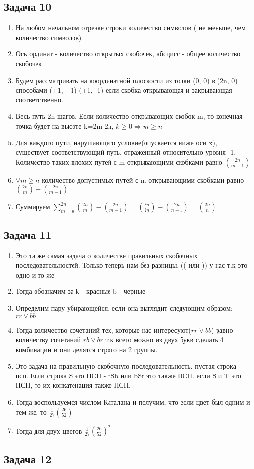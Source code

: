 \documentclass[a4paper,12pt]{article}
\begin{document}
\subsection{Задача 10}
\begin{enumerate}
    \item На любом начальном отрезке строки количество символов ( не меньше, чем количество символов)
    \item Ось ординат - количество открытых скобочек, абсцисс - общее количество скобочек
    \item Будем рассматривать на координатной плоскости из точки (0, 0) в (2n, 0) способами (+1, +1) (+1, -1) если скобка открывающая и закрывающая соответственно.
    \item Весь путь 2n шагов, Если количество открывающих скобок m, то конечная точка будет на высоте k=2m-2n, $k\ge 0 \Rightarrow m\ge n$ 
    \item Для каждого пути, нарушающего условие(опускается ниже оси x), существует соответствующий путь, отраженный относительно уровня -1. Количество таких плохих путей с m открывающими скобками равно $\binom{2n}{m-1}$
    \item $\forall m\ge n$ количество допустимых путей с m открывающими скобками равно $\binom{2n}{m}-\binom{2n}{m-1}$
    \item Суммируем $\sum_{m=n}^{2n} \binom{2n}{m}-\binom{2n}{m-1}=\binom{2n}{2n}-\binom{2n}{n-1}=\binom{2n}{n}$
\end{enumerate}

\subsection{Задача 11}
\begin{enumerate}
    \item Это та же самая задача о количестве правильных скобочных последовательностей. Только теперь нам без разницы, (( или )) у нас т.к это одно и то же
    \item Тогда обозначим за k - красные b - черные
    \item Определим пару убирающейся, если она выглядит следующим образом: $rr\lor bb$
    \item Тогда количество сочетаний тех, которые нас интересуют($rr\lor bb$) равно количеству сочетаний $rb \lor br$ т.к всего можно из двух букв сделать 4 комбинации и они делятся строго на 2 группы.
    \item Это задача на правильную скобочную последовательность. пустая строка - псп. Если строка S это ПСП - rSb или bSr это также ПСП. если S и T это ПСП, то их конкатенация также ПСП.
    \item Тогда воспользуемся числом Каталана и получим, что если цвет был одним и тем же, то $\frac{1}{27}\binom{26}{52}$
    \item Тогда для двух цветов $\frac{1}{27}\binom{26}{52}^2$
\end{enumerate}

\subsection{Задача 12}
\end{document}

